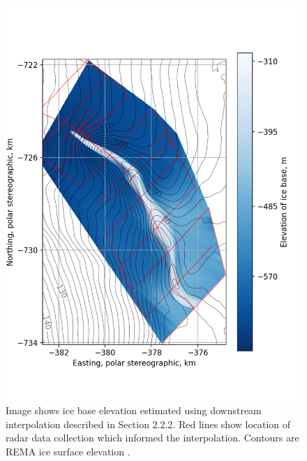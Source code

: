 \begin{figure}[h!]
\includegraphics[width=1\textwidth]{chapters/2/ice_base_solo.png}
 \caption[Ice base map]{Image shows ice base elevation estimated using downstream interpolation described in Section 2.2.2. Red lines show location of radar data collection which informed the interpolation. Contours are REMA ice surface elevation \cite{howat2019reference}.
}
\label{fig:ice_base_solo}
\end{figure}
%
